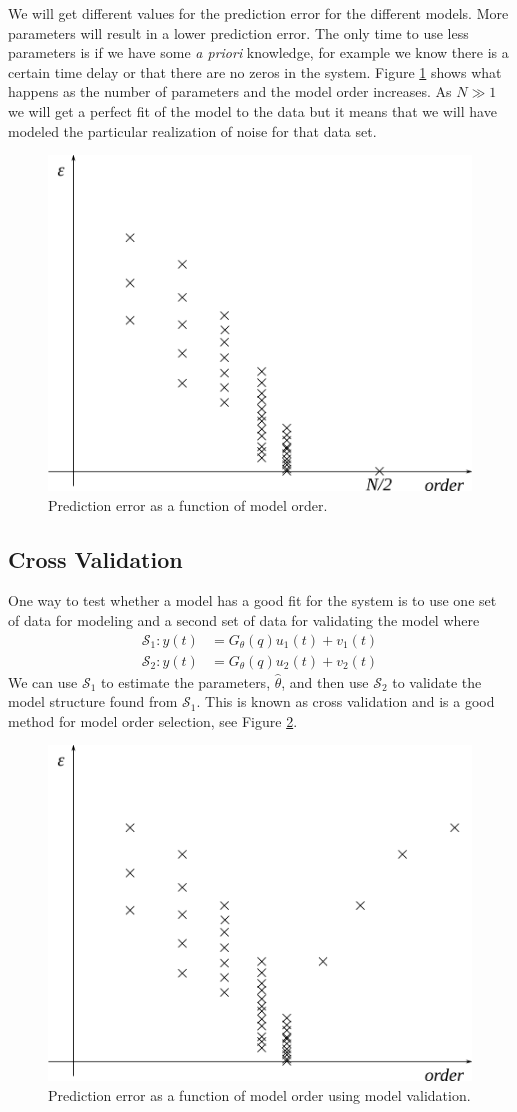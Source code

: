 We will get different values for the prediction error for the different models. More parameters will result in a lower prediction error. The only time to use less parameters is if we have some \textit{a priori} knowledge, for example we know there is a certain time delay or that there are no zeros in the system. Figure \ref{fig:19order} shows what happens as the number of parameters and the model order increases. As $N\gg1$ we will get a perfect fit of the model to the data but it means that we will have modeled the particular realization of noise for that data set.

\begin{figure}[ht!]
	\centering
	\includegraphics[width=.4\textwidth]{images/19order}
	\caption{Prediction error as a function of model order.}
	\label{fig:19order}
\end{figure}

\subsection{Cross Validation}
One way to test whether a model has a good fit for the system is to use one set of data for modeling and a second set of data for validating the model where
\begin{align*}
\mathcal{S}_1: y(t) &= G_\theta(q)u_1(t) + v_1(t) \\
\mathcal{S}_2: y(t) &= G_\theta(q)u_2(t) + v_2(t)
\end{align*}
We can use $\mathcal{S}_1$ to estimate the parameters, $\hat{\theta}$, and then use $\mathcal{S}_2$ to validate the model structure found from $\mathcal{S}_1$. This is known as cross validation and is a good method for model order selection, see Figure \ref{fig:19xvalid}.

\begin{figure}[ht!]
	\centering
	\includegraphics[width=.4\textwidth]{images/19xvalid}
	\caption{Prediction error as a function of model order using model validation.}
	\label{fig:19xvalid}
\end{figure}

